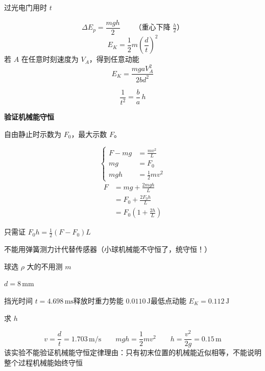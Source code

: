 
过光电门用时 $t$

\[ \Delta E_p=\frac{mgh}{2}\qquad\text{（重心下降 }\tfrac{h}{2}\text{）} \]
\[ E_K=\frac12m\left(\frac{d}{t}\right)^2 \]
若 $A$ 在任意时刻速度为 $V_A$，得到任意动能
\[ E_K=\frac{mgaV_A^2}{2bd^2} \]


\[ \frac{1}{t^2}=\frac{b}{a}\,h \]

\textbf{验证机械能守恒}


自由静止时示数为 $F_0$，最大示数 $F$。

\[
\left\{\begin{aligned}
F-mg&=\frac{mv^2}{L}\\
mg&=F_0\\
mgh&=\tfrac12 mv^2
\end{aligned}\right.
\]
\begin{align*}
F&=mg+\frac{2mgh}{L}\\
&=F_0+\frac{2F_0h}{L}\\
&=F_0\left(1+\frac{2h}{L}\right)
\end{align*}

\begin{keybox}
只需证 $F_0h=\frac12(F-F_0)L$ %
\end{keybox}

不能用弹簧测力计代替传感器（小球机械能不守恒了，统守恒！）

球选 $\rho$ 大的\quad 不用测 $m$

\begin{problem}

$d=8\,\mathrm{mm}$

挡光时间 $t=4.698\,\mathrm{ms}$\quad 释放时重力势能 $0.0110\,\mathrm{J}$\quad 最低点动能 $E_K=0.112\,\mathrm{J}$ %

求 $h$
\begin{solution}
\[ v=\frac{d}{t}=1.703\,\mathrm{m/s}\qquad mgh=\frac12mv^2\qquad h=\frac{v^2}{2g}=0.15\,\mathrm{m} \]
该实验不能验证机械能守恒定律\quad 理由：只有初末位置的机械能近似相等，不能说明整个过程机械能始终守恒
\end{solution}
\end{problem}


